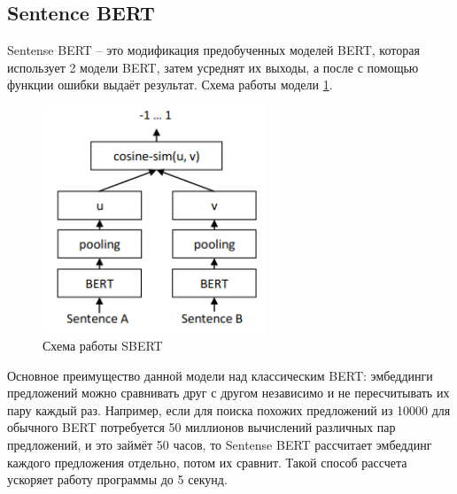 \documentclass[PI, VKR]{HSEUniversity}
\begin{document}
\subsection{Sentence BERT}
\label{sec:orga5951b0}
Sentense BERT \autocite{reimers_sentence-bert_2019} -- это модификация предобученных моделей BERT, которая использует 2 модели BERT, затем усреднят их выходы, а после с помощью функции ошибки выдаёт результат. Схема работы модели \ref{fig:sbert}.
\begin{figure}[h!]
\centering
\includegraphics[width=0.6\textwidth]{img/sbert.png}
\caption{\label{fig:sbert}Схема работы SBERT}
\end{figure}
Основное преимущество данной модели над классическим BERT: эмбеддинги предложений можно сравнивать друг с другом независимо и не пересчитывать их пару каждый раз. Например, если для поиска похожих предложений из 10000 для обычного BERT потребуется 50 миллионов вычислений различных пар предложений, и это займёт 50 часов, то Sentense BERT рассчитает эмбеддинг каждого предложения отдельно, потом их сравнит. Такой способ рассчета ускоряет работу программы до 5 секунд.
\end{document}
